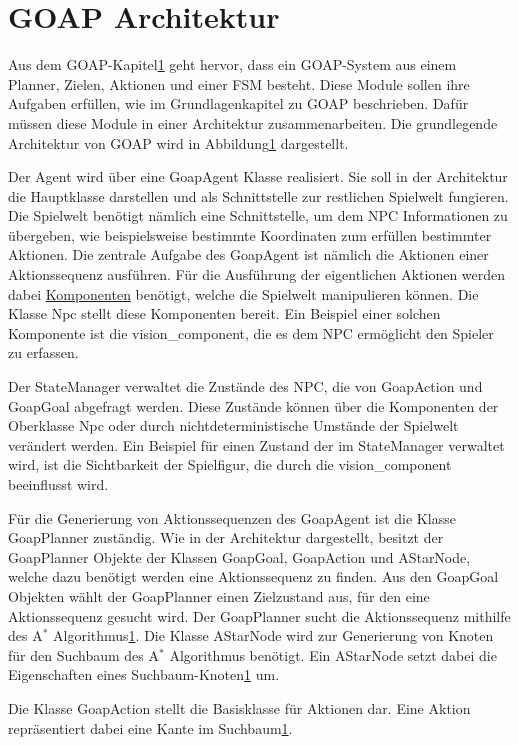 \section{GOAP Architektur}

Aus dem GOAP-Kapitel\ref{} geht hervor, dass ein GOAP-System aus einem Planner, Zielen, Aktionen und einer FSM besteht. Diese Module sollen ihre Aufgaben erfüllen, wie im Grundlagenkapitel zu GOAP beschrieben. Dafür müssen diese Module in einer Architektur zusammenarbeiten. Die grundlegende Architektur von GOAP wird in Abbildung\ref{} dargestellt.

Der Agent wird über eine GoapAgent Klasse realisiert. Sie soll in der Architektur die Hauptklasse darstellen und als Schnittstelle zur restlichen Spielwelt fungieren. Die Spielwelt benötigt nämlich eine Schnittstelle, um dem NPC Informationen zu übergeben, wie beispielsweise bestimmte Koordinaten zum erfüllen bestimmter Aktionen. Die zentrale Aufgabe des GoapAgent ist nämlich die Aktionen einer Aktionssequenz ausführen. Für die Ausführung der eigentlichen Aktionen werden dabei \hyperref[chap:game-objects]{Komponenten} benötigt, welche die Spielwelt manipulieren können. Die Klasse Npc stellt diese Komponenten bereit. Ein Beispiel einer solchen Komponente ist die vision\_component, die es dem NPC ermöglicht den Spieler zu erfassen.

Der StateManager verwaltet die Zustände des NPC, die von GoapAction und GoapGoal abgefragt werden. Diese Zustände können über die Komponenten der Oberklasse Npc oder durch nichtdeterministische Umstände der Spielwelt verändert werden. Ein Beispiel für einen Zustand der im StateManager verwaltet wird, ist die Sichtbarkeit der Spielfigur, die durch die vision\_component beeinflusst wird.

Für die Generierung von Aktionssequenzen des GoapAgent ist die Klasse GoapPlanner zuständig. Wie in der Architektur dargestellt, besitzt der GoapPlanner Objekte der Klassen GoapGoal, GoapAction und AStarNode, welche dazu benötigt werden eine Aktionssequenz zu finden. Aus den GoapGoal Objekten wählt der GoapPlanner einen Zielzustand aus, für den eine Aktionssequenz gesucht wird. Der GoapPlanner sucht die Aktionssequenz mithilfe des A$^*$ Algorithmus\ref{}. Die Klasse AStarNode wird zur Generierung von Knoten für den Suchbaum des A$^*$ Algorithmus benötigt. Ein AStarNode setzt dabei die Eigenschaften eines Suchbaum-Knoten\ref{} um.

Die Klasse GoapAction stellt die Basisklasse für Aktionen dar. Eine Aktion repräsentiert dabei eine Kante im Suchbaum\ref{}.

